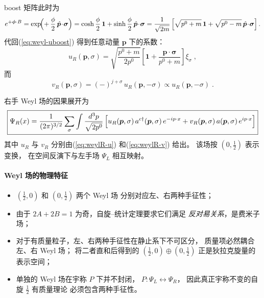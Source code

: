 boost 矩阵此时为
\[
  e^{+\boldsymbol{\phi}\cdot B}
  = \exp\!\Bigl(+\,\frac{\phi}{2}\,\hat{\boldsymbol{p}}\!\cdot\!\boldsymbol{\sigma}\Bigr)
  = \cosh\frac{\phi}{2}\,\mathbf{1}
    + \sinh\frac{\phi}{2}\,\hat{\boldsymbol{p}}\!\cdot\!\boldsymbol{\sigma}
  = \frac{1}{\sqrt{2m}}
    \left[\sqrt{p^{0}+m}\,\mathbf{1}
          +\sqrt{p^{0}-m}\,\hat{\boldsymbol{p}}\!\cdot\!\boldsymbol{\sigma}\right].
\]
代回(\ref{eq:weyl-uboost}) 得到任意动量 $\boldsymbol{p}$ 下的系数：
\begin{equation}\label{eq:weylR-u}
  u_{R}(\boldsymbol{p},\sigma)
  = \sqrt{\frac{p^{0}+m}{2p^{0}}}
    \left[\mathbf{1}
          +\frac{\boldsymbol{p}\!\cdot\!\boldsymbol{\sigma}}{p^{0}+m}\right]\xi_{\sigma}\;,
\end{equation}
而
\begin{equation}\label{eq:weylR-v}
  v_{R}(\boldsymbol{p},\sigma)
  =(-)^{j+\sigma}\,u_{R}(\boldsymbol{p},-\sigma)
  \propto u_{R}(\boldsymbol{p},-\sigma)\;.
\end{equation}

右手 Weyl 场的因果展开为
\begin{equation}\label{eq:weylR-field}
  \boxed{
  \Psi_{R}(x)
  = \frac{1}{(2\pi)^{3/2}}\sum_{\sigma}\int\frac{d^{3}p}{\sqrt{2p^{0}}}\,
    \Bigl[u_{R}(\boldsymbol{p},\sigma)\,a^{c\dagger}(\boldsymbol{p},\sigma)\,e^{-ip\cdot x}
         + v_{R}(\boldsymbol{p},\sigma)\,a(\boldsymbol{p},\sigma)\,e^{ip\cdot x}\Bigr]
  }
\end{equation}
其中 $u_{R}$ 与 $v_{R}$ 分别由(\ref{eq:weylR-u}) 和(\ref{eq:weylR-v}) 给出。
该场按 $(0,\tfrac12)$ 表示变换，
在空间反演下与左手场 $\Psi_{L}$ 相互映射。

\paragraph{Weyl 场的物理特征}
\begin{itemize}
  \item $(\tfrac12,0)$ 和 $(0,\tfrac12)$ 两个 Weyl 场
        分别对应左、右两种手征性；
  \item 由于 $2A+2B=1$ 为奇，自旋–统计定理要求它们满足
        \emph{反对易关系}，是费米子场；
  \item 对于有质量粒子，左、右两种手征性在静止系下不可区分，
        质量项必然耦合左、右 Weyl 场；
        将二者直和后得到的 $(\tfrac12,0)\oplus(0,\tfrac12)$
        正是狄拉克旋量的表示空间；
  \item 单独的 Weyl 场在宇称 $P$ 下并不封闭，
        $P:\Psi_{L}\leftrightarrow\Psi_{R}$，
        因此真正宇称不变的自旋 $\tfrac12$ 有质量理论
        必须包含两种手征性。
\end{itemize}



